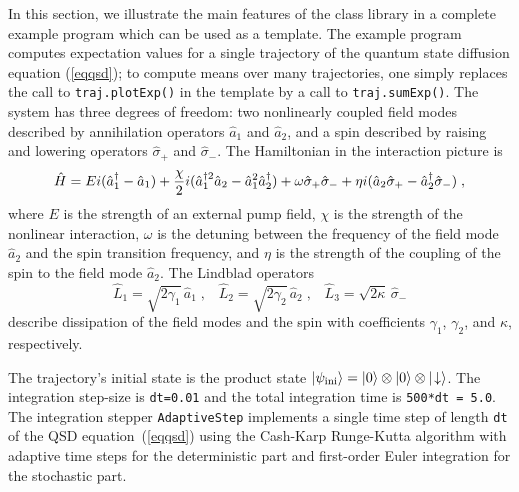 In this section, we illustrate the main features of the class library in a
complete example program which can be used as a template.  The example program
computes expectation values for a single trajectory of the quantum state
diffusion equation (\ref{eqqsd}); to compute means over many trajectories, one
simply replaces the call to {\tt traj.plotExp()} in the template by a call to 
{\tt traj.sumExp()}.  The system has three degrees of freedom:
two nonlinearly coupled field modes described by annihilation operators $\hat
a_1$ and $\hat a_2$, and a spin described by raising and lowering operators
$\hat\sigma_+$ and $\hat\sigma_-$. The Hamiltonian in the interaction picture
is \cite{Schack1996c}
\begin{equation}
\hat H = Ei(\hat a_1^\dagger-\hat a_1) + {\chi\over2}i(\hat a_1^{\dagger2}\hat a_2 
    - \hat a_1^2\hat a_2^\dagger) + \omega\hat\sigma_+\hat\sigma_-
    + \eta i(\hat a_2\hat\sigma_+  - \hat a_2^\dagger\hat\sigma_-) \;,
\end{equation}
where $E$ is the strength of an external pump field, $\chi$ is the strength of
the nonlinear interaction, $\omega$ is the detuning between the frequency of
the field mode $\hat a_2$ and the spin transition frequency, and $\eta$ is
the strength of the coupling of the spin to the field mode $\hat a_2$. The
Lindblad operators
\begin{equation}
\hat L_1=\sqrt{2\gamma_1}\,\hat a_1 \;,\;\;\;
\hat L_2=\sqrt{2\gamma_2}\,\hat a_2 \;,\;\;\;
\hat L_3=\sqrt{2\kappa}\,\hat\sigma_-
\end{equation}
describe dissipation of the field modes and the spin with coefficients
$\gamma_1$, $\gamma_2$, and $\kappa$, respectively. 

The trajectory's initial state is the product state $| \psi_{\rm
ini} \rangle=| 0 \rangle\otimes| 0 \rangle\otimes|\!\downarrow\rangle$. The integration step-size
is {\tt dt=0.01} and the total integration time is {\tt 500*dt = 5.0}.  The
integration stepper {\tt AdaptiveStep} implements a single time step of length
{\tt dt} of the QSD equation~(\ref{eqqsd}) using the Cash-Karp Runge-Kutta
algorithm with adaptive time steps {\cite{Press1992}} for the deterministic
part and first-order Euler integration for the stochastic part.

